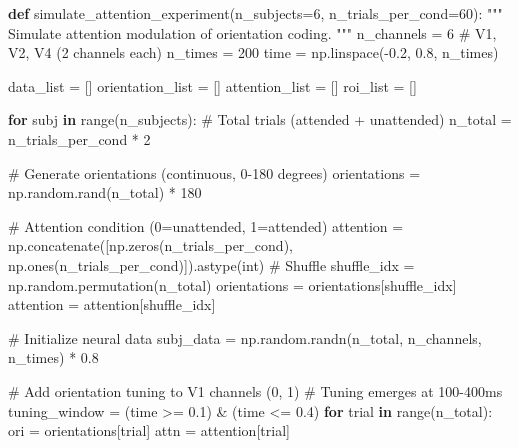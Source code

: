 \documentclass[
  11pt,
  letterpaper,
  oneside,
  openany]{book}
\newenvironment{Shaded}{\begin{snugshade}}{\end{snugshade}}
\newcommand{\BuiltInTok}[1]{\textcolor[rgb]{0.00,0.23,0.31}{#1}}
\newcommand{\CommentTok}[1]{\textcolor[rgb]{0.37,0.37,0.37}{#1}}
\newcommand{\ControlFlowTok}[1]{\textcolor[rgb]{0.00,0.23,0.31}{\textbf{#1}}}
\newcommand{\DecValTok}[1]{\textcolor[rgb]{0.68,0.00,0.00}{#1}}
\newcommand{\FloatTok}[1]{\textcolor[rgb]{0.68,0.00,0.00}{#1}}
\newcommand{\KeywordTok}[1]{\textcolor[rgb]{0.00,0.23,0.31}{\textbf{#1}}}
\newcommand{\NormalTok}[1]{\textcolor[rgb]{0.00,0.23,0.31}{#1}}
\newcommand{\OperatorTok}[1]{\textcolor[rgb]{0.37,0.37,0.37}{#1}}
\begin{document}
\begin{Shaded}
\begin{Highlighting}[]
\KeywordTok{def}\NormalTok{ simulate\_attention\_experiment(n\_subjects}\OperatorTok{=}\DecValTok{6}\NormalTok{, n\_trials\_per\_cond}\OperatorTok{=}\DecValTok{60}\NormalTok{):}
    \CommentTok{"""}
\CommentTok{    Simulate attention modulation of orientation coding.}
\CommentTok{    """}
\NormalTok{    n\_channels }\OperatorTok{=} \DecValTok{6}  \CommentTok{\# V1, V2, V4 (2 channels each)}
\NormalTok{    n\_times }\OperatorTok{=} \DecValTok{200}
\NormalTok{    time }\OperatorTok{=}\NormalTok{ np.linspace(}\OperatorTok{{-}}\FloatTok{0.2}\NormalTok{, }\FloatTok{0.8}\NormalTok{, n\_times)}
    
\NormalTok{    data\_list }\OperatorTok{=}\NormalTok{ []}
\NormalTok{    orientation\_list }\OperatorTok{=}\NormalTok{ []}
\NormalTok{    attention\_list }\OperatorTok{=}\NormalTok{ []}
\NormalTok{    roi\_list }\OperatorTok{=}\NormalTok{ []}
    
    \ControlFlowTok{for}\NormalTok{ subj }\KeywordTok{in} \BuiltInTok{range}\NormalTok{(n\_subjects):}
        \CommentTok{\# Total trials (attended + unattended)}
\NormalTok{        n\_total }\OperatorTok{=}\NormalTok{ n\_trials\_per\_cond }\OperatorTok{*} \DecValTok{2}
        
        \CommentTok{\# Generate orientations (continuous, 0{-}180 degrees)}
\NormalTok{        orientations }\OperatorTok{=}\NormalTok{ np.random.rand(n\_total) }\OperatorTok{*} \DecValTok{180}
        
        \CommentTok{\# Attention condition (0=unattended, 1=attended)}
\NormalTok{        attention }\OperatorTok{=}\NormalTok{ np.concatenate([np.zeros(n\_trials\_per\_cond), }
\NormalTok{                                   np.ones(n\_trials\_per\_cond)]).astype(}\BuiltInTok{int}\NormalTok{)}
        \CommentTok{\# Shuffle}
\NormalTok{        shuffle\_idx }\OperatorTok{=}\NormalTok{ np.random.permutation(n\_total)}
\NormalTok{        orientations }\OperatorTok{=}\NormalTok{ orientations[shuffle\_idx]}
\NormalTok{        attention }\OperatorTok{=}\NormalTok{ attention[shuffle\_idx]}
        
        \CommentTok{\# Initialize neural data}
\NormalTok{        subj\_data }\OperatorTok{=}\NormalTok{ np.random.randn(n\_total, n\_channels, n\_times) }\OperatorTok{*} \FloatTok{0.8}
        
        \CommentTok{\# Add orientation tuning to V1 channels (0, 1)}
        \CommentTok{\# Tuning emerges at 100{-}400ms}
\NormalTok{        tuning\_window }\OperatorTok{=}\NormalTok{ (time }\OperatorTok{\textgreater{}=} \FloatTok{0.1}\NormalTok{) }\OperatorTok{\&}\NormalTok{ (time }\OperatorTok{\textless{}=} \FloatTok{0.4}\NormalTok{)}
        \ControlFlowTok{for}\NormalTok{ trial }\KeywordTok{in} \BuiltInTok{range}\NormalTok{(n\_total):}
\NormalTok{            ori }\OperatorTok{=}\NormalTok{ orientations[trial]}
\NormalTok{            attn }\OperatorTok{=}\NormalTok{ attention[trial]}
            

\end{Highlighting}
\end{Shaded}
\end{document}
